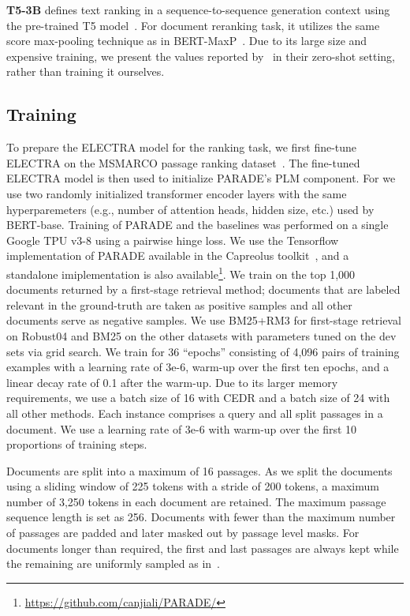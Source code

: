 {\bf T5-3B}
defines text ranking in a sequence-to-sequence generation context using the pre-trained T5 model~\cite{DBLP:journals/corr/abs-2003-06713}.
For document reranking task, it utilizes the same score max-pooling technique as in BERT-MaxP~\cite{DBLP:conf/sigir/DaiC19}. Due to its large size and expensive training, we present the values reported by~\cite{DBLP:journals/corr/abs-2003-06713} in their zero-shot setting, rather than training it ourselves.

\subsection{Training} \label{sec:training}
To prepare the ELECTRA model for the ranking task, we first fine-tune ELECTRA on the MSMARCO passage ranking dataset~\cite{msmarco}.
The fine-tuned ELECTRA model is then used to initialize PARADE's PLM component.
For  we use two randomly initialized transformer encoder layers with the same hyperparemeters  (e.g., number of attention heads, hidden size, etc.) used by BERT-base.
Training of PARADE and the baselines was performed on a single Google TPU v3-8 using a pairwise hinge loss.
We use the Tensorflow implementation of PARADE available in the Capreolus toolkit~\cite{yates2020capreolus}, and a standalone imiplementation is also available\footnote{\url{https://github.com/canjiali/PARADE/}}.
We train on the top 1,000 documents returned by a first-stage retrieval method; documents that are labeled relevant in the ground-truth are taken as positive samples and all other documents serve as negative samples.
We use BM25+RM3 for first-stage retrieval on Robust04 and BM25 on the other datasets with parameters tuned on the dev sets via grid search.
We train for 36 ``epochs'' consisting of 4,096 pairs of training examples with a learning rate of 3e-6, warm-up over the first ten epochs, and a linear decay rate of 0.1 after the warm-up.
Due to its larger memory requirements, we use a batch size of 16 with CEDR and a batch size of 24 with all other methods.
Each instance comprises a query and all split passages in a document.
We use a learning rate of 3e-6 with warm-up over the first 10 proportions of training steps.


Documents are split into a maximum of 16 passages. 
As we split the documents using a sliding window of 225 tokens with a stride of 200 tokens, a maximum number of 3,250 tokens in each document are retained.
The maximum passage sequence length is set as 256.
Documents with fewer than the maximum number of passages are padded and later masked out by passage level masks.
For documents longer than required, the first and last passages are always kept while the remaining are uniformly sampled as in~\cite{DBLP:conf/sigir/DaiC19}.

